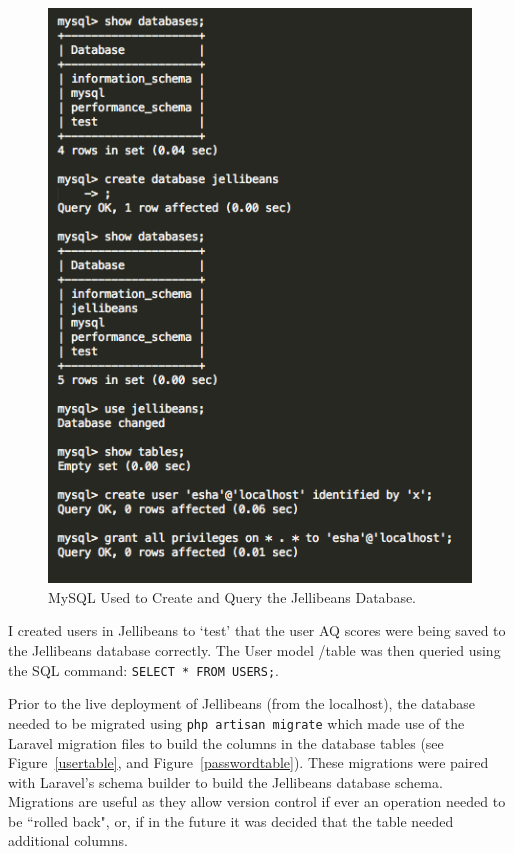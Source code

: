 \documentclass[a4paper, 11pt]{article}
\begin{document}
\begin{figure}[H]
\begin{center}
\includegraphics[scale=0.5]{mysql}
\caption{MySQL Used to Create and Query the Jellibeans Database.}
\label{mysql}
\end{center}
\end{figure}


I created users in Jellibeans to `test' that the user AQ scores were being saved to the Jellibeans database correctly. The User model /table was then queried using the SQL command: \texttt{SELECT * FROM USERS;}.

\vspace{5mm}
Prior to the live deployment of Jellibeans (from the localhost), the database needed to be migrated using \texttt{php artisan migrate} which made use of the Laravel migration files to build the columns in the database tables (see Figure~\ref{usertable}, and Figure~\ref{passwordtable}). These migrations were paired with Laravel's schema builder to build the Jellibeans database schema. Migrations are useful as they allow version control if ever an operation needed to be ``rolled back", or, if in the future it was decided that the table needed additional columns.
\end{document}
